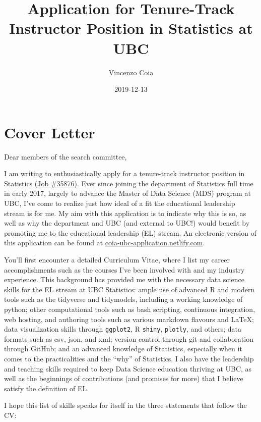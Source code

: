 \documentclass[]{article}
\title{Application for Tenure-Track Instructor Position in Statistics at UBC}
\author{Vincenzo Coia}
\date{2019-12-13}
\begin{document}
\maketitle

{
\hypersetup{linkcolor=black}
\setcounter{tocdepth}{2}
\tableofcontents
}
\hypertarget{cover-letter}{%
\section{Cover Letter}\label{cover-letter}}

Dear members of the search committee,

I am writing to enthusiastically apply for a tenure-track instructor position in Statistics (\href{https://www.stat.ubc.ca/three-tenure-track-instructor-positions-statistics-35876}{Job \#35876}). Ever since joining the department of Statistics full time in early 2017, largely to advance the Master of Data Science (MDS) program at UBC, I've come to realize just how ideal of a fit the educational leadership stream is for me. My aim with this application is to indicate why this is so, as well as why the department and UBC (and external to UBC!) would benefit by promoting me to the educational leadership (EL) stream. An electronic version of this application can be found at \href{https://coia-ubc-application.netlify.com/}{coia-ubc-application.netlify.com}.

You'll first encounter a detailed Curriculum Vitae, where I list my career accomplishments such as the courses I've been involved with and my industry experience. This background has provided me with the necessary data science skills for the EL stream at UBC Statistics: ample use of advanced R and modern tools such as the tidyverse and tidymodels, including a working knowledge of python; other computational tools such as bash scripting, continuous integration, web hosting, and authoring tools such as various markdown flavours and LaTeX; data visualization skills through \texttt{ggplot2}, R \texttt{shiny}, \texttt{plotly}, and others; data formats such as csv, json, and xml; version control through git and collaboration through GitHub; and an advanced knowledge of Statistics, especially when it comes to the practicalities and the ``why'' of Statistics. I also have the leadership and teaching skills required to keep Data Science education thriving at UBC, as well as the beginnings of contributions (and promises for more) that I believe satisfy the definition of EL.

I hope this list of skills speaks for itself in the three statements that follow the CV:
\end{document}
